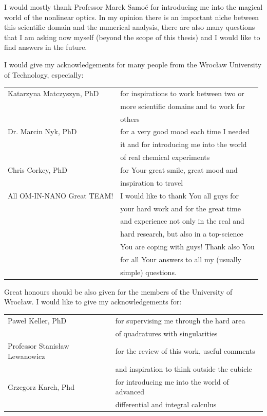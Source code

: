 \documentclass[12pt,twoside,a4paper]{article}
\numberwithin{equation}{subsection}
\numberwithin{figure}{subsection}
\begin{document}
I would mostly thank Professor Marek Samoć for introducing me into the magical world of the nonlinear optics. In my opinion there
is an important niche between this scientific domain and the numerical analysis, there are also many questions that I am asking now
myself (beyond the scope of this thesis) and I would like to find answers in the future.


I would give my acknowledgements for many people from the Wrocław University of Technology, especially:


\begin{tabular}{l l}
	Katarzyna Matczyszyn, PhD  & for inspirations to work between two or \\
	                           & more scientific domains and to work for \\ 
	                           & others \\ 
	Dr. Marcin Nyk, PhD        & for a very good mood each time I needed \\
	                           & it and for introducing me into the world \\
	                           & of real chemical experiments \\
	Chris Corkey, PhD          & for Your great smile, great mood and \\
	                           & inspiration to travel \\
	All OM-IN-NANO Great TEAM! & I would like to thank You all guys for \\ 
	                           & your hard work and for the great time \\
	                           & and experience not only in the real and \\
	                           & hard research, but also in a top-science \\
	                           & You are coping with guys! Thank also You \\
	                           & for all Your answers to all my (usually \\
	                           & simple) questions. \\
\end{tabular}


Great honours should be also given for the members of the University of Wrocław. I would like to give my acknowledgements for:


\begin{tabular}{l l}
    Paweł Keller, PhD              & for supervising me through the hard area \\
                                   & of quadratures with singularities \\ 
    Professor Stanisław Lewanowicz & for the review of this work, useful comments \\
    							   & and inspiration to think outside the cubicle \\
    Grzegorz Karch, Phd            & for introducing me into the world of advanced \\
                                   & differential and integral calculus \\
\end{tabular}
\end{document}
